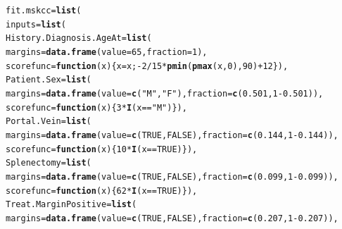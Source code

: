 \documentclass{article}\usepackage[]{graphicx}\usepackage[]{color}
\makeatletter
\newcommand{\hlnum}[1]{\textcolor[rgb]{0.686,0.059,0.569}{#1}}%
\newcommand{\hlstr}[1]{\textcolor[rgb]{0.192,0.494,0.8}{#1}}%
\newcommand{\hlopt}[1]{\textcolor[rgb]{0,0,0}{#1}}%
\newcommand{\hlstd}[1]{\textcolor[rgb]{0.345,0.345,0.345}{#1}}%
\newcommand{\hlkwa}[1]{\textcolor[rgb]{0.161,0.373,0.58}{\textbf{#1}}}%
\newcommand{\hlkwb}[1]{\textcolor[rgb]{0.69,0.353,0.396}{#1}}%
\newcommand{\hlkwc}[1]{\textcolor[rgb]{0.333,0.667,0.333}{#1}}%
\newcommand{\hlkwd}[1]{\textcolor[rgb]{0.737,0.353,0.396}{\textbf{#1}}}%
\newenvironment{kframe}{%
 \def\at@end@of@kframe{}%
 \ifinner\ifhmode%
  \def\at@end@of@kframe{\end{minipage}}%
  \begin{minipage}{\columnwidth}%
 \fi\fi%
 \def\FrameCommand##1{\hskip\@totalleftmargin \hskip-\fboxsep
 \colorbox{shadecolor}{##1}\hskip-\fboxsep
     \hskip-\linewidth \hskip-\@totalleftmargin \hskip\columnwidth}%
 \MakeFramed {\advance\hsize-\width
   \@totalleftmargin\z@ \linewidth\hsize
   \@setminipage}}%
 {\par\unskip\endMakeFramed%
 \at@end@of@kframe}
\newenvironment{knitrout}{}{} %
\makeatother
\begin{document}
\begin{knitrout}
\color{fgcolor}\begin{kframe}
\begin{alltt}
\hlstd{fit.mskcc} \hlkwb{=} \hlkwd{list}\hlstd{(}
        \hlkwc{inputs} \hlstd{=} \hlkwd{list}\hlstd{(}
        \hlkwc{History.Diagnosis.AgeAt} \hlstd{=} \hlkwd{list}\hlstd{(}
                \hlkwc{margins} \hlstd{=} \hlkwd{data.frame}\hlstd{(}\hlkwc{value} \hlstd{=} \hlnum{65}\hlstd{,} \hlkwc{fraction} \hlstd{=} \hlnum{1}\hlstd{),}
                \hlkwc{scorefunc} \hlstd{=} \hlkwa{function}\hlstd{(}\hlkwc{x}\hlstd{) \{ x} \hlkwb{=} \hlstd{x;} \hlopt{-}\hlnum{2}\hlopt{/}\hlnum{15}\hlopt{*}\hlkwd{pmin}\hlstd{(}\hlkwd{pmax}\hlstd{(x,} \hlnum{0}\hlstd{),} \hlnum{90}\hlstd{)} \hlopt{+} \hlnum{12} \hlstd{\}),}
        \hlkwc{Patient.Sex} \hlstd{=} \hlkwd{list}\hlstd{(}
                \hlkwc{margins} \hlstd{=} \hlkwd{data.frame}\hlstd{(}\hlkwc{value} \hlstd{=} \hlkwd{c}\hlstd{(}\hlstr{"M"}\hlstd{,} \hlstr{"F"}\hlstd{),} \hlkwc{fraction} \hlstd{=} \hlkwd{c}\hlstd{(}\hlnum{0.501}\hlstd{,} \hlnum{1}\hlopt{-}\hlnum{0.501}\hlstd{)),}
                \hlkwc{scorefunc} \hlstd{=} \hlkwa{function}\hlstd{(}\hlkwc{x}\hlstd{) \{} \hlnum{3}\hlopt{*}\hlkwd{I}\hlstd{(x} \hlopt{==} \hlstr{"M"}\hlstd{) \}),}
        \hlkwc{Portal.Vein} \hlstd{=} \hlkwd{list}\hlstd{(}
                \hlkwc{margins} \hlstd{=} \hlkwd{data.frame}\hlstd{(}\hlkwc{value} \hlstd{=} \hlkwd{c}\hlstd{(}\hlnum{TRUE}\hlstd{,} \hlnum{FALSE}\hlstd{),} \hlkwc{fraction} \hlstd{=} \hlkwd{c}\hlstd{(}\hlnum{0.144}\hlstd{,} \hlnum{1}\hlopt{-}\hlnum{0.144}\hlstd{)),}
                \hlkwc{scorefunc} \hlstd{=} \hlkwa{function}\hlstd{(}\hlkwc{x}\hlstd{) \{} \hlnum{10}\hlopt{*}\hlkwd{I}\hlstd{(x} \hlopt{==} \hlnum{TRUE}\hlstd{) \}),}
        \hlkwc{Splenectomy} \hlstd{=} \hlkwd{list}\hlstd{(}
                \hlkwc{margins} \hlstd{=} \hlkwd{data.frame}\hlstd{(}\hlkwc{value} \hlstd{=} \hlkwd{c}\hlstd{(}\hlnum{TRUE}\hlstd{,} \hlnum{FALSE}\hlstd{),} \hlkwc{fraction} \hlstd{=} \hlkwd{c}\hlstd{(}\hlnum{0.099}\hlstd{,} \hlnum{1}\hlopt{-}\hlnum{0.099}\hlstd{)),}
                \hlkwc{scorefunc} \hlstd{=} \hlkwa{function}\hlstd{(}\hlkwc{x}\hlstd{) \{} \hlnum{62}\hlopt{*}\hlkwd{I}\hlstd{(x} \hlopt{==} \hlnum{TRUE}\hlstd{) \}),}
        \hlkwc{Treat.MarginPositive} \hlstd{=} \hlkwd{list}\hlstd{(}
                \hlkwc{margins} \hlstd{=} \hlkwd{data.frame}\hlstd{(}\hlkwc{value} \hlstd{=} \hlkwd{c}\hlstd{(}\hlnum{TRUE}\hlstd{,} \hlnum{FALSE}\hlstd{),} \hlkwc{fraction} \hlstd{=} \hlkwd{c}\hlstd{(}\hlnum{0.207}\hlstd{,} \hlnum{1}\hlopt{-}\hlnum{0.207}\hlstd{)),}

\end{alltt}
\end{kframe}
\end{knitrout}
\end{document}
